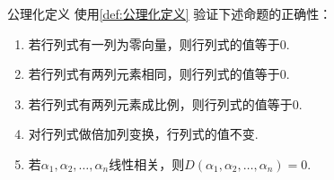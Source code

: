 \begin{example}{}{公理化定义}
    使用\autoref{def:公理化定义} 验证下述命题的正确性：
    \begin{enumerate}
        \item 若行列式有一列为零向量，则行列式的值等于0.

        \item 若行列式有两列元素相同，则行列式的值等于0.

        \item 若行列式有两列元素成比例，则行列式的值等于0.

        \item 对行列式做倍加列变换，行列式的值不变.

        \item \label{item:13:公理化定义导出性质:5}
            若$\alpha_1,\alpha_2,\ldots,\alpha_n$线性相关，则$D(\alpha_1,\alpha_2,\ldots,\alpha_n)=0$.
    \end{enumerate}
\end{example}

